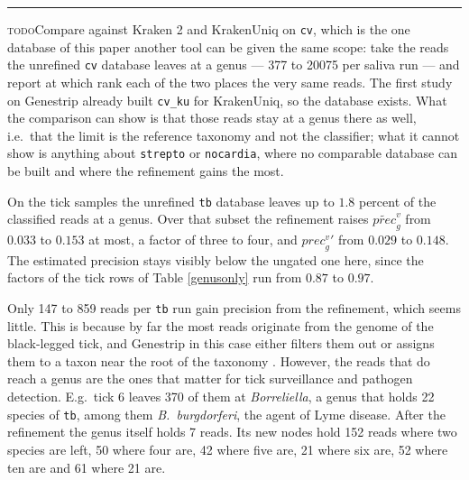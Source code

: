 \documentclass[pdflatex,sn-vancouver-num]{sn-jnl}
\newif\ifshowtodos \showtodostrue
\newcommand{\todo}[1]{%
  \ifshowtodos
    \par\addvspace{0.7\baselineskip}%
    \begin{list}{}{%
      \setlength{\leftmargin}{1.5em}%
      \setlength{\rightmargin}{1.5em}%
      \setlength{\topsep}{0pt}%
      \setlength{\partopsep}{0pt}%
      \setlength{\parsep}{0.5\baselineskip}%
      \setlength{\itemsep}{0pt}%
    }%
    \item[]\footnotesize\color{black!70}%
      \textcolor{orange!65!black}{\rule[-0.2ex]{2pt}{1.15ex}}\hspace{0.55em}%
      \textcolor{orange!65!black}{\textsc{todo}}\hspace{0.6em}\ignorespaces#1%
    \end{list}%
    \addvspace{0.7\baselineskip}%
  \fi%
}
\begin{document}
    \todo{Compare against Kraken 2 and KrakenUniq on \texttt{cv}, which is the one database of this paper another tool can be given the same scope: take the reads the unrefined \texttt{cv} database leaves at a genus --- \num{377} to \num{20075} per saliva run --- and report at which rank each of the two places the very same reads. The first study on Genestrip already built \texttt{cv\_ku} for KrakenUniq, so the database exists. What the comparison can show is that those reads stay at a genus there as well, i.e.\ that the limit is the reference taxonomy and not the classifier; what it cannot show is anything about \texttt{strepto} or \texttt{nocardia}, where no comparable database can be built and where the refinement gains the most.}

    On the tick samples the unrefined \texttt{tb} database leaves up to $1.8$ percent of the classified reads at a genus. Over that subset the refinement raises $\widetilde{\mathit{prec}}^v_g$ from $0.033$ to $0.153$ at most, a factor of three to four, and $\mathit{prec}^{v}_g{}'$ from $0.029$ to $0.148$. The estimated precision stays visibly below the ungated one here, since the factors of the tick rows of Table \ref{genusonly} run from $0.87$ to $0.97$.

    Only \num{147} to \num{859} reads per \texttt{tb} run gain precision from the refinement, which seems little. This is because by far the most reads originate from the genome of the black-legged tick, and Genestrip in this case either filters them out or assigns them to a taxon near the root of the taxonomy \citep{genestrip-pub}. However, the reads that do reach a genus are the ones that matter for tick surveillance and pathogen detection. E.g.\ tick 6 leaves \num{370} of them at \emph{Borreliella}, a genus that holds \num{22} species of \texttt{tb}, among them \emph{B.~burgdorferi}, the agent of Lyme disease. After the refinement the genus itself holds \num{7} reads. Its new nodes hold \num{152} reads where two species are left, \num{50} where four are, \num{42} where five are, \num{21} where six are, \num{52} where ten are and \num{61} where \num{21} are.
\end{document}
